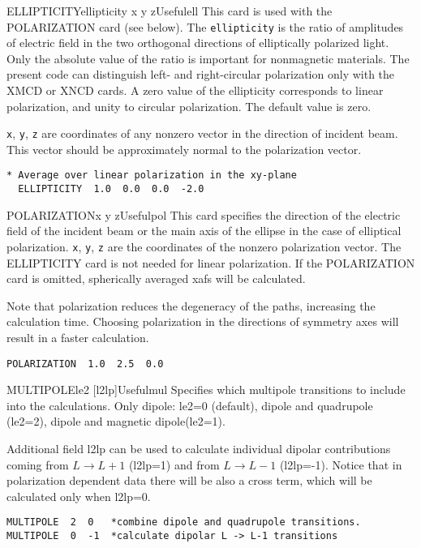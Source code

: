 \documentclass[11pt,oneside]{report} %
\begin{document}
\begin{Card}{ELLIPTICITY}{ellipticity x y z}{Useful}{ell}
  This card is used with the POLARIZATION card (see below).
  The \texttt{ellipticity} is the ratio of amplitudes of electric
  field in the two orthogonal directions of elliptically polarized
  light.  Only the absolute value of the ratio is important for
  nonmagnetic materials.  The present code can distinguish left- and
  right-circular polarization only with the XMCD or XNCD cards.
  A zero value of the ellipticity corresponds to linear polarization,
  and unity to circular polarization.  The default value is zero.

  \texttt{x}, \texttt{y}, \texttt{z} are coordinates of any nonzero
  vector in the direction of incident beam. This vector should be
  approximately normal to the polarization vector.
\begin{verbatim}
* Average over linear polarization in the xy-plane
  ELLIPTICITY  1.0  0.0  0.0  -2.0
\end{verbatim}
\end{Card}


\begin{Card}{POLARIZATION}{x y z}{Useful}{pol}
  This card specifies the direction of the electric field of the
  incident beam or the main axis of the ellipse in the case of
  elliptical polarization.  \texttt{x}, \texttt{y}, \texttt{z} are the
  coordinates of the nonzero polarization vector.  The ELLIPTICITY
  card is not needed for linear polarization.  If the POLARIZATION
  card is omitted, spherically averaged xafs will be calculated.

  Note that polarization reduces the degeneracy of the paths,
  increasing the calculation time.  Choosing polarization in the
  directions of symmetry axes will result in a faster calculation.
\begin{verbatim}
POLARIZATION  1.0  2.5  0.0
\end{verbatim}
\end{Card}

\begin{Card}{MULTIPOLE}{le2 [l2lp]}{Useful}{mul}
  Specifies which multipole transitions to include into the calculations.
Only dipole: le2=0 (default), dipole and quadrupole (le2=2), dipole and
magnetic dipole(le2=1). 

Additional field l2lp can be used to calculate individual dipolar contributions
coming from $L \rightarrow L+1$ (l2lp=1) and from $L \rightarrow L-1$ 
(l2lp=-1).  Notice that in polarization dependent data there will be also a
cross term, which will be calculated only when l2lp=0.
\begin{verbatim}
MULTIPOLE  2  0   *combine dipole and quadrupole transitions.
MULTIPOLE  0  -1  *calculate dipolar L -> L-1 transitions
\end{verbatim}
\end{Card}
\end{document}
